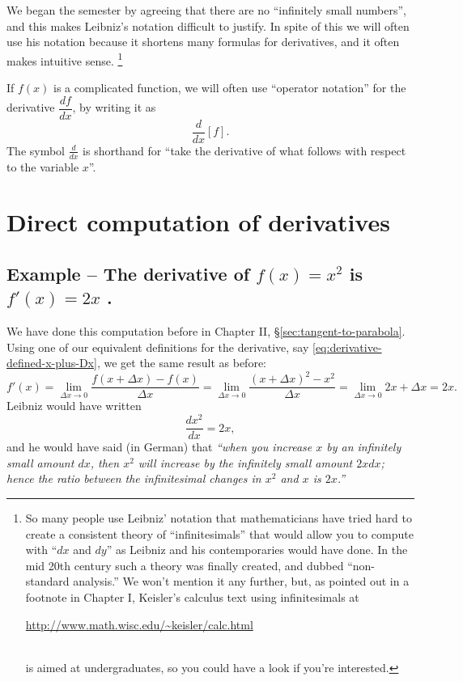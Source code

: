 We began the semester by agreeing that there are no ``infinitely small
numbers'', and this makes Leibniz's notation difficult to justify.  In
spite of this we will often use his notation because it shortens
many formulas for derivatives, and it often makes intuitive sense.%
\footnote{So many people use Leibniz' notation that mathematicians have
  tried hard to create a consistent theory of ``infinitesimals'' that
  would allow you to compute with ``$dx$ and $dy$'' as Leibniz and his
  contemporaries would have done.  In the mid 20th century such a
  theory was finally created, and dubbed ``non-standard analysis.'' We
  won't mention it any further, but, as pointed out in a footnote in
  Chapter I, Keisler's calculus text using infinitesimals at\\
  \centerline{\url{http://www.math.wisc.edu/~keisler/calc.html}}\\
  is aimed at undergraduates, so you could have a look if you're
  interested.}


If $f(x)$ is a complicated function, we will often use ``operator notation'' for
the derivative $\dfrac{df}{dx}$, by writing it as
\[
  \frac{d}{dx}\left[f\right].
\]
The symbol $\frac{d}{dx}$ is shorthand for ``take the derivative of what
follows with respect to the variable $x$''.




\section{Direct computation of derivatives} 
\label{sec:direct-derivative-computation}




\subsection{Example -- The derivative of $f(x)= x^2$ is $f'(x) = 2x$  . } 
We have done this computation before in Chapter II,
\S\ref{sec:tangent-to-parabola}.  Using one of our equivalent definitions for the
derivative, say \eqref{eq:derivative-defined-x-plus-Dx}, we get the
same result as before:
\[
f'(x)= \lim_{{\Delta x}\to 0} \frac{f(x+{\Delta x})-f(x)}{{\Delta x}}
= \lim_{{\Delta x}\to 0}
\frac{(x+{\Delta x})^2-x^2}{{\Delta x}}=\lim_{{\Delta x}\to 0} 2x+{\Delta x} =2x.
\]
Leibniz would have written
\[
\frac{dx^2}{dx} = 2x,
\]
and he would have said (in German) that {\slshape ``when you increase
  $x$ by an infinitely small amount $dx$, then $x^2$ will increase by
  the infinitely small amount $2xdx$; hence the ratio between the
  infinitesimal changes in $x^2$ and $x$ is $2x$.''}


